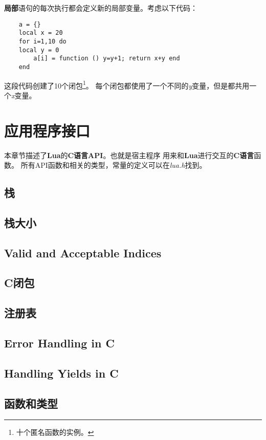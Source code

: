 \documentclass{ctexart}
\begin{document}
\textbf{局部}语句的每次执行都会定义新的局部变量。考虑以下代码：

\lstset{language=C}
\begin{lstlisting}
	a = {}
	local x = 20
	for i=1,10 do
	local y = 0
		a[i] = function () y=y+1; return x+y end
	end
\end{lstlisting}

这段代码创建了10个闭包\footnote{十个匿名函数的实例。}。
每个闭包都使用了一个不同的\emph{y}变量，但是都共用一个\emph{x}变量。

\section{应用程序接口}

本章节描述了\textbf{Lua}的\textbf{C语言API}。也就是宿主程序
用来和\textbf{Lua}进行交互的\textbf{C语言}函数。
所有API函数和相关的类型，常量的定义可以在\emph{lua.h}找到。


\subsection{栈}

\subsection{栈大小}

\subsection{Valid and Acceptable Indices}

\subsection{C闭包}

\subsection{注册表}

\subsection{Error Handling in C}

\subsection{Handling Yields in C}

\subsection{函数和类型}
\end{document}
